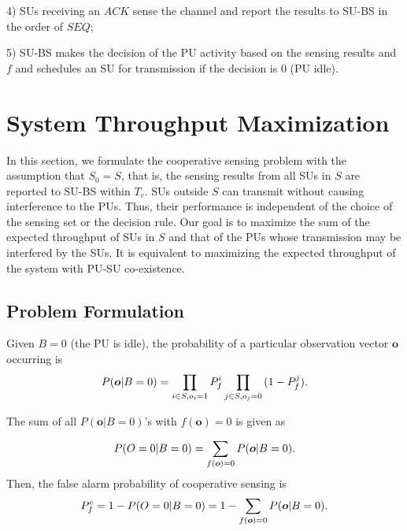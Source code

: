 \documentclass[conference]{IEEEtran}
\begin{document}
4) SUs receiving an $ACK$ sense the channel and report the results to SU-BS in the order of $SEQ$;

5) SU-BS makes the decision of the PU activity based on the sensing results and $f$ and schedules an SU for transmission if the decision is $0$ (PU idle).

\section{System Throughput Maximization}
\label{sec:max}
In this section, we formulate the cooperative sensing problem with the assumption that $S_0=S$, that is, the sensing results from all SUs in $S$ are reported to SU-BS within $T_c$. SUs outside $S$ can transmit without causing interference to the PUs. Thus, their performance is independent of the choice of the sensing set or the decision rule. Our goal is to maximize the sum of the expected throughput of SUs in $S$ and that of the PUs whose transmission may be interfered by the SUs. It is equivalent to maximizing the expected throughput of the system with PU-SU co-existence. 

\subsection{Problem Formulation}
\label{subsec:max_formulation}

Given $B=0$ (the PU is idle), the probability of a particular observation vector $\boldsymbol{o}$ occurring is 
\vspace{-0.5em}
\begin{equation}
P(\boldsymbol{o}|B=0)=\prod\limits_{i\in S,o_i=1}{P_f^i} \prod\limits_{j\in S,o_j=0}{(1-P_f^j)}.
\vspace{-0.5em}
\end{equation}

The sum of all $P(\boldsymbol{o}|B=0)$'s with $f(\boldsymbol{o})=0$ is given as 
\vspace{-0.2em}

\begin{equation}
P(O=0|B=0)=\sum\limits_{f(\boldsymbol{o})=0}{P(\boldsymbol{o}|B=0)}.
\vspace{-0.5em}
\label{eq:correct0}
\end{equation}
Then, the false alarm probability of cooperative sensing is
\vspace{-0.5em}
\begin{equation} 
P_f^c=1-P(O=0|B=0)=1-\sum\limits_{f(\boldsymbol{o})=0}{P(\boldsymbol{o}|B=0)}.
\vspace{-0.5em}
\label{eq:bin0prob}
\end{equation}
\end{document}
